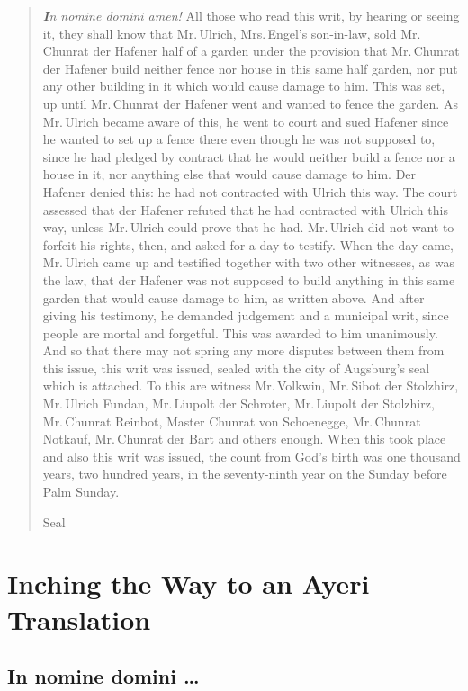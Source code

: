 \documentclass[12pt,paper=a4]{scrartcl}
\begin{document}
\begin{quotation}
\emph{\textbf{I}n nomine domini amen!} All those who read this writ, 
by hearing or seeing it, they shall know that Mr.\,Ulrich, Mrs.\,Engel's 
son-in-law, sold Mr.\,Chunrat der Hafener half of a garden under the provision 
that Mr.\,Chunrat der Hafener build neither fence nor house in this same half 
garden, nor put any other building in it which would cause damage to him. 
This was set, up until Mr.\,Chunrat der Hafener went and wanted to fence the 
garden. As Mr.\,Ulrich became aware of this, he went to court and sued Hafener 
since he wanted to set up a fence there even though he was not supposed to, 
since he had pledged by contract that he would neither build a fence nor a house 
in it, nor anything else that would cause damage to him. Der Hafener denied 
this: he had not contracted with Ulrich this way. The court assessed that der 
Hafener refuted that he had contracted with Ulrich this way, unless Mr.\,Ulrich 
could prove that he had. Mr.\,Ulrich did not want to forfeit his rights, then, 
and asked for a day to testify. When the day came, Mr.\,Ulrich came up and 
testified together with two other witnesses, as was the law, that der Hafener was 
not supposed to build anything in this same garden that would cause damage to 
him, as written above. And after giving his testimony, he demanded judgement and 
a municipal writ, since people are mortal and forgetful. This was awarded to him 
unanimously. And so that there may not spring any more disputes between them 
from this issue, this writ was issued, sealed with the city of Augsburg's seal 
which is attached. To this are witness Mr.\,Volkwin, Mr.\,Sibot der Stolzhirz, 
Mr.\,Ulrich Fundan, Mr.\,Liupolt der Schroter, Mr.\,Liupolt der Stolzhirz, 
Mr.\,Chunrat Reinbot, Master Chunrat von Schoenegge, Mr.\,Chunrat Notkauf, 
Mr.\,Chunrat der Bart and others enough. When this took place and also this 
writ was issued, the count from God's birth was one thousand years, two hundred 
years, in the seventy-ninth year on the Sunday before Palm Sunday.

\begin{center}
Seal
\end{center}
\end{quotation}

\section{Inching the Way to an Ayeri Translation}

\subsection*{In nomine domini …}
\end{document}
